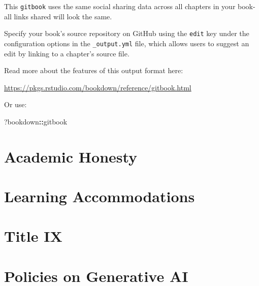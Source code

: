 \documentclass[
]{book}
\newenvironment{Shaded}{\begin{snugshade}}{\end{snugshade}}
\newcommand{\NormalTok}[1]{#1}
\newcommand{\OperatorTok}[1]{\textcolor[rgb]{0.81,0.36,0.00}{\textbf{#1}}}
\begin{document}
This \texttt{gitbook} uses the same social sharing data across all chapters in your book- all links shared will look the same.

Specify your book's source repository on GitHub using the \texttt{edit} key under the configuration options in the \texttt{\_output.yml} file, which allows users to suggest an edit by linking to a chapter's source file.

Read more about the features of this output format here:

\url{https://pkgs.rstudio.com/bookdown/reference/gitbook.html}

Or use:

\begin{Shaded}
\begin{Highlighting}[]
\NormalTok{?bookdown}\OperatorTok{::}\NormalTok{gitbook}
\end{Highlighting}
\end{Shaded}

\hypertarget{academic-honesty}{%
\chapter{Academic Honesty}\label{academic-honesty}}

\hypertarget{learning-accommodations}{%
\chapter{Learning Accommodations}\label{learning-accommodations}}

\hypertarget{title-ix}{%
\chapter{Title IX}\label{title-ix}}

\hypertarget{policies-on-generative-ai}{%
\chapter{Policies on Generative AI}\label{policies-on-generative-ai}}

  
\end{document}
